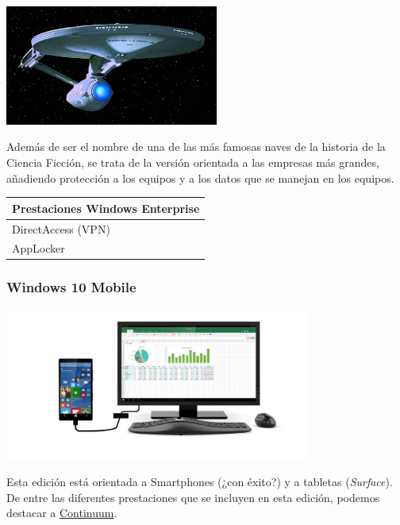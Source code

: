 \documentclass[11pt]{article}
\begin{document}
\begin{center}
\includegraphics[width=7cm]{./imgs/win10-enterprise.jpg}
\end{center}

Además de ser el nombre de una de las más famosas naves de la historia de la Ciencia Ficción, 
se trata de la versión orientada a las empresas más grandes, añadiendo protección a los equipos
y a los datos que se manejan en los equipos.

\begin{center}
\begin{tabular}{l}
Prestaciones Windows Enterprise\\
\hline
DirectAccess (VPN)\\
AppLocker\\
\end{tabular}
\end{center}


\newpage
\subsubsection{Windows 10 Mobile}
\label{sec:orge7732e6}

\begin{center}
\includegraphics[width=10cm]{./imgs/win10-mobile.jpg}
\end{center}

Esta edición está orientada a Smartphones (¿con éxito?) y a tabletas (\emph{Surface}). 
De entre las diferentes prestaciones que se incluyen en esta edición, podemos destacar
a \href{https://www.microsoft.com/es-es/windows/continuum}{Continuum}.
\end{document}
